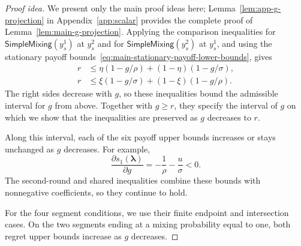 \documentclass[11pt]{article}
\theoremstyle{remark}
\theoremstyle{plain}
\newcommand{\sm}{\mathsf{SimpleMixing}}
\begin{document}
\begin{proof}[Proof idea]
We present only the main proof ideas here;
Lemma~\ref{lem:app-g-projection} in Appendix~\ref{app:scalar}
provides the complete proof of Lemma~\ref{lem:main-g-projection}.
Applying the comparison inequalities for $\sm(y_s^1)$ at $y_s^2$
and for $\sm(y_s^2)$ at $y_s^1$, and using the stationary payoff
bounds~\eqref{eq:main-stationary-payoff-lower-bounds}, gives
\begin{equation}
 \begin{aligned}
 r&\le\eta(1-g/\rho)+(1-\eta)(1-g/\sigma),\\
 r&\le\xi(1-g/\sigma)+(1-\xi)(1-g/\rho).
 \end{aligned}
 \label{eq:main-first-round-g-comparisons}
\end{equation}
The right sides decrease with $g$, so these inequalities bound
the admissible interval for $g$ from above. Together with $g\ge r$,
they specify the interval of $g$ on which we show that the
inequalities are preserved as $g$ decreases to $r$.

Along this interval, each of the six payoff upper bounds increases
or stays unchanged as $g$ decreases. For example,
\[
 \frac{\partial s_1(\boldsymbol\lambda)}{\partial g}=-\frac1\rho-\frac u\sigma<0.
\]
The second-round and shared inequalities combine these bounds with
nonnegative coefficients, so they continue to hold.

For the four segment conditions, we use their finite endpoint and
intersection cases. On the two segments ending at a mixing
probability equal to one, both regret upper bounds increase as
$g$ decreases.


\end{proof}
\end{document}
